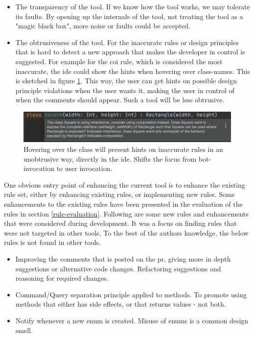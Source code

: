 \documentclass[pdftex,10pt,b5paper,twoside]{report}
\begin{document}
\begin{itemize}
    \item The transparency of the tool. If we know how the tool works, we may tolerate its faults. By opening up the internals of the tool, not treating the tool as a "magic black box", more noise or faults could be accepted.
    
    \item The obtrusiveness of the tool. For the inaccurate rules or design principles that is hard to detect a new approach that makes the developer in control is suggested. For example for the \gls{coi} rule, which is considered the most inaccurate, the \gls{ide} could show the hints when hovering over class-names. This is sketched in figure \ref{fig:a-new-beginning}. This way, the user can get hints on possible design principle violations when the user wants it, making the user in control of when the comments should appear. Such a tool will be less obtrusive. 

\end{itemize}


\begin{figure}[h!]
    \centering
    \includegraphics[width=\linewidth]{report/a-new-beginning (2).png}
    \caption{Hovering over the class will present hints on inaccurate rules in an unobtrusive way, directly in the \gls{ide}. Shifts the focus from bot-invocation to user invocation.}
    \label{fig:a-new-beginning}
\end{figure}


One obvious entry point of enhancing the current tool is to enhance the existing rule set, either by enhancing existing rules, or implementing new rules. Some enhancements to the existing rules have been presented in the evaluation of the rules in section \ref{rule-evaluation}. Following are some new rules and enhancements that were considered during development. It was a focus on finding rules that were not targeted in other tools. To the best of the authors knowledge, the below rules is not found in other tools. 

\begin{itemize}
    \item Improving the comments that is posted on the \gls{pr}, giving more in depth suggestions or alternative code changes. Refactoring suggestions and reasoning for required changes.  
    
    \item Command/Query separation principle applied to methods. To promote using methods that either has side effects, or that returns values - not both. 
    
    \item Notify whenever a new enum is created. Misuse of enums is a common design smell.
\end{itemize}
\end{document}

